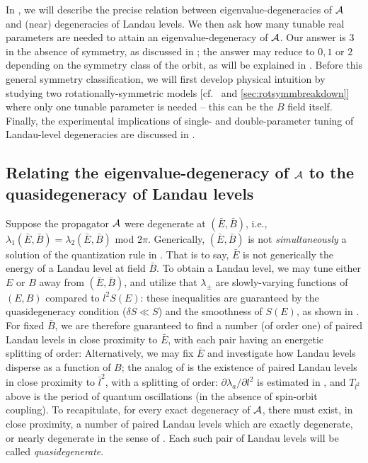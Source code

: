\documentclass[aps, prb, showpacs, twocolumn, notitlepage, superscriptaddress]{revtex4-1}
\begin{document}
In , we will describe the precise relation between eigenvalue-degeneracies of  ${\cal A}$ and (near) degeneracies of Landau levels. We then ask how many tunable real parameters are needed to attain an eigenvalue-degeneracy of ${\cal A}$. Our answer is  $3$ in the absence of symmetry, as discussed in ; the answer may reduce to $0,1$ or $2$ depending on the symmetry class of the orbit, as will be explained in . Before this general symmetry classification,  we will first develop physical intuition by studying two rotationally-symmetric models [cf.\  and \ref{sec:rotsymmbreakdown}] where only one tunable parameter is needed -- this can be the $B$ field itself. Finally, the experimental implications of single- and double-parameter tuning of Landau-level degeneracies are discussed in .

\subsection{Relating the eigenvalue-degeneracy of ${\cal A}$ to the quasidegeneracy of Landau levels}

Suppose the propagator ${\cal A}$ were degenerate at $(\bar{E},\bar{B})$, i.e., $\lambda_1(\bar{E},\bar{B})=\lambda_2(\bar{E},\bar{B})$ mod $2\pi$. Generically, $(\bar{E},\bar{B})$ is not \emph{simultaneously} a solution of the quantization rule in . That is to say, $\bar{E}$ is not generically the energy of a Landau level at field $\bar{B}$. To obtain a Landau level, we may tune either $E$ or $B$   away from $(\bar{E},\bar{B})$, and  utilize that  $\lambda_{\pm}$ are slowly-varying functions of $(E,B)$ compared to $l^2S(E)$:
these inequalities are guaranteed by the quasidegeneracy condition ($\delta S{\ll}S$) and the smoothness of $S(E)$, as shown in .  For fixed $\bar{B}$, we are therefore guaranteed to find a number (of order one) of paired Landau levels  in close proximity to $\bar{E}$, with each pair having an energetic splitting of order:
Alternatively, we may fix $\bar{E}$ and investigate how Landau levels disperse as a function of $B$; the analog of   is the existence of paired Landau levels in close proximity to $\bar{l}^2$, with a splitting of order:
$\partial \lambda_a/\partial l^2$ is estimated in , and
$T_{l^2}$ above is the period of quantum oscillations (in the absence of spin-orbit coupling). To recapitulate, for every exact degeneracy of ${\cal A}$, there must exist, in close proximity, a number of paired Landau levels which are exactly degenerate, or nearly degenerate in the sense of . Each such pair of Landau levels will be called \textit{quasidegenerate}.  
\end{document}

